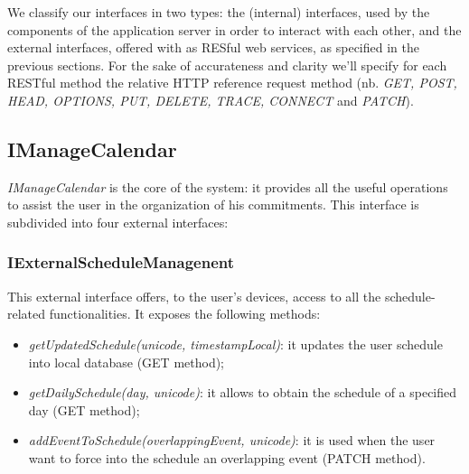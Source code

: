 We classify our interfaces in two types: the (internal) interfaces, used by the components of the application server in order to interact with each other, and the external interfaces, offered with as RESful web services, as specified in the previous sections. For the sake of accurateness and clarity we'll specify for each RESTful method the relative HTTP reference request method (nb. \textit{GET, POST, HEAD, OPTIONS, PUT, DELETE, TRACE, CONNECT } and \textit{PATCH}).
\subsection{IManageCalendar}
\label{subsect: IManageCalendar}
\textit{IManageCalendar} is the core of the system: it provides all the useful operations to assist the user in the organization of his commitments. This interface is subdivided into four external interfaces:

\subsubsection{IExternalScheduleManagenent}
This external interface offers, to the user's devices, access to all the schedule-related functionalities. It exposes the following methods:
\begin{itemize}
\item \textit{getUpdatedSchedule(unicode, timestampLocal)}: it updates the user schedule into local database (GET method);
\item \textit{getDailySchedule(day, unicode)}: it allows to obtain the schedule of a specified day (GET method);
\item \textit{addEventToSchedule(overlappingEvent, unicode)}: it is used when the user want to force into the schedule an overlapping event (PATCH method). 
\end{itemize}

